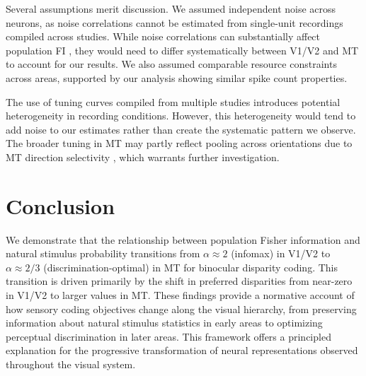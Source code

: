 \documentclass[12pt]{article}
\begin{document}
Several assumptions merit discussion. We assumed independent noise across neurons, as noise correlations cannot be estimated from single-unit recordings compiled across studies. While noise correlations can substantially affect population FI \citep{moreno2014information, averbeck2006neural}, they would need to differ systematically between V1/V2 and MT to account for our results. We also assumed comparable resource constraints across areas, supported by our analysis showing similar spike count properties.

The use of tuning curves compiled from multiple studies introduces potential heterogeneity in recording conditions. However, this heterogeneity would tend to add noise to our estimates rather than create the systematic pattern we observe. The broader tuning in MT may partly reflect pooling across orientations due to MT direction selectivity \citep{deangelis1998cortical}, which warrants further investigation.

\section{Conclusion}

We demonstrate that the relationship between population Fisher information and natural stimulus probability transitions from $\alpha \approx 2$ (infomax) in V1/V2 to $\alpha \approx 2/3$ (discrimination-optimal) in MT for binocular disparity coding. This transition is driven primarily by the shift in preferred disparities from near-zero in V1/V2 to larger values in MT. These findings provide a normative account of how sensory coding objectives change along the visual hierarchy, from preserving information about natural stimulus statistics in early areas to optimizing perceptual discrimination in later areas. This framework offers a principled explanation for the progressive transformation of neural representations observed throughout the visual system.



\end{document}
